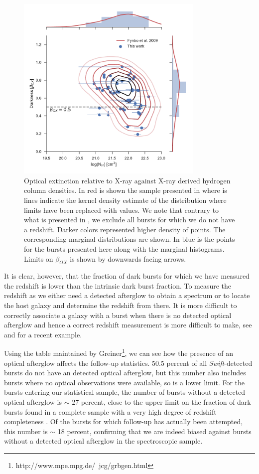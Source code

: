 \documentclass{aa}    %
\begin{document}
\begin{figure}
	\centerline{\includegraphics[width=9cm]{figures/betaOX.pdf}} \caption{Optical
	extinction relative to X-ray against X-ray derived hydrogen column densities.
	In red is shown the sample presented in \citet{Fynbo2009} where is lines
	indicate the kernel density estimate of the distribution where limits have been
	replaced with values. We note that contrary to what is presented in
	\citet{Fynbo2009}, we exclude all bursts for which we do not have a redshift.
	Darker colors represented higher density of points. The corresponding marginal
	distributions are shown. In blue is the points for the bursts presented here
	along with the marginal histograms. Limits on $\beta_{OX}$ is shown by
	downwards facing arrows.} \label{fig:betaOX}
\end{figure}

It is clear, however, that the fraction of dark bursts for which we have 
measured the redshift is lower than the intrinsic dark burst fraction. To measure the
redshift as we either need a detected afterglow to obtain a spectrum or to 
locate the host galaxy and determine the redshift from there. It is more difficult to
correctly associate a galaxy with a burst when there is no detected optical
afterglow and hence a correct redshift measurement is more difficult to make,
see \citet{Jakobsson2005, Levesque2010} and \citet{Perley2017} for a recent
example. 

Using the table maintained by
Greiner\footnote{http://www.mpe.mpg.de/~jcg/grbgen.html}, we can see how the
presence of an optical afterglow affects the follow-up statistics. 50.5 percent
of all \textit{Swift}-detected bursts do not have an detected optical afterglow,
but this number also includes bursts where no optical observations were
available, so is a lower limit. For the bursts entering our statistical sample,
the number of bursts without a detected optical afterglow is $\sim$ 27 percent,
close to the upper limit on the fraction of dark bursts found in a complete
sample with a very high degree of redshift completeness \citep{Melandri2012}. Of
the bursts for which follow-up has actually been attempted, this number is
$\sim$ 18 percent, confirming that we are indeed biased against bursts without a
detected optical afterglow in the spectroscopic sample.
\end{document}
